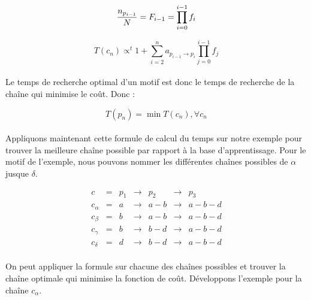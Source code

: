 \documentclass[12pt,french,twoside]{report}
\begin{document}
\begin{equation}
 {n_{p_{i-1}} \over N} = F_{i-1} = \prod_{i=0}^{i-1} f_i
\end{equation}

\begin{equation}
 T(c_n) \propto^t 1 + \sum_{i=2}^n a_{p_{i-1} \rightarrow p_i} \prod_{j=0}^{i-1} f_j
\end{equation}

\paragraph{}Le temps de recherche optimal d'un motif est donc le temps de recherche de la chaîne qui minimise le coût. Donc :

\begin{equation}
 T(p_n) = \min T(c_n), \forall c_n
\end{equation}


\paragraph{}Appliquons maintenant cette formule de calcul du temps sur notre exemple pour trouver la meilleure chaîne possible par
rapport à la base d'apprentissage. Pour le motif de l'exemple, nous pouvons nommer les différentes chaînes possibles de $\alpha$
jusque $\delta$.

\[
\begin{array}{ccccccc}
 c         & = & p_1 & \rightarrow & p_2     & \rightarrow & p_3 \\
 c_\alpha  & = & a   & \rightarrow & a\!-\!b & \rightarrow & a\!-\!b\!-\!d \\
 c_\beta   & = & b   & \rightarrow & a\!-\!b & \rightarrow & a\!-\!b\!-\!d \\
 c_\gamma  & = & b   & \rightarrow & b\!-\!d & \rightarrow & a\!-\!b\!-\!d \\
 c_\delta  & = & d   & \rightarrow & b\!-\!d & \rightarrow & a\!-\!b\!-\!d \\
\end{array}
\]

On peut appliquer la formule sur chacune des chaînes possibles et trouver la chaîne optimale qui minimise la fonction de
coût. Développons l'exemple pour la chaîne $c_{\alpha}$.
\end{document}
